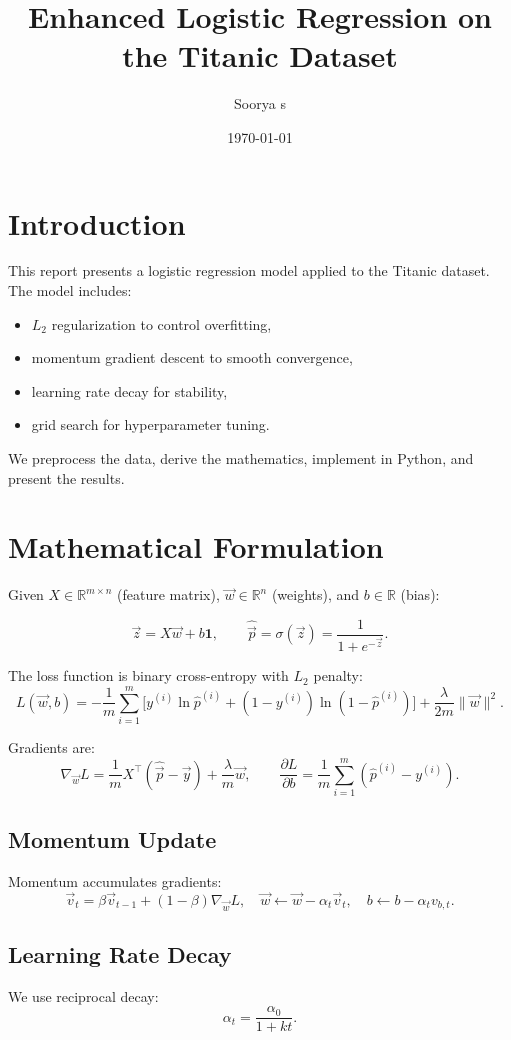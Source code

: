 \documentclass[12pt]{article}
\title{Enhanced Logistic Regression on the Titanic Dataset}
\author{Soorya s}
\date{\today}
\begin{document}
\maketitle

\section{Introduction}
This report presents a logistic regression model applied to the Titanic dataset.  
The model includes:
\begin{itemize}
  \item $L_2$ regularization to control overfitting,
  \item momentum gradient descent to smooth convergence,
  \item learning rate decay for stability,
  \item grid search for hyperparameter tuning.
\end{itemize}
We preprocess the data, derive the mathematics, implement in Python, and present the results.

\section{Mathematical Formulation}
Given $X \in \mathbb{R}^{m \times n}$ (feature matrix), $\vec w \in \mathbb{R}^n$ (weights), and $b \in \mathbb{R}$ (bias):

\[
\vec z = X\vec w + b\mathbf{1}, 
\qquad
\hat{\vec p} = \sigma(\vec z) = \frac{1}{1 + e^{-\vec z}}.
\]

The loss function is binary cross-entropy with $L_2$ penalty:
\[
L(\vec w, b) = -\frac{1}{m}\sum_{i=1}^m \Big[ y^{(i)}\ln \hat p^{(i)} + (1-y^{(i)})\ln(1-\hat p^{(i)}) \Big] + \frac{\lambda}{2m}\|\vec w\|^2.
\]

Gradients are:
\[
\nabla_{\vec w} L = \frac{1}{m}X^\top(\hat{\vec p}-\vec y) + \frac{\lambda}{m}\vec w,
\qquad
\frac{\partial L}{\partial b} = \frac{1}{m}\sum_{i=1}^m(\hat p^{(i)} - y^{(i)}).
\]

\subsection*{Momentum Update}
Momentum accumulates gradients:
\[
\vec v_t = \beta \vec v_{t-1} + (1-\beta)\nabla_{\vec w}L,
\quad
\vec w \leftarrow \vec w - \alpha_t \vec v_t,
\quad
b \leftarrow b - \alpha_t v_{b,t}.
\]

\subsection*{Learning Rate Decay}
We use reciprocal decay:
\[
\alpha_t = \frac{\alpha_0}{1 + k t}.
\]
\end{document}
